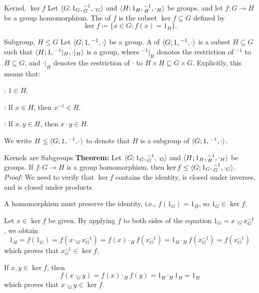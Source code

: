 \begin{dfnbox}{Kernel, $\ker f$}
	Let ${\langle {G; 1_G, {}^{-1}_G, \cdot_G} \rangle}$ and ${\langle {H; 1_H, {}^{-1}_H, \cdot_H} \rangle}$ be groups, and let $f: G \to H$ be a group homomorphism. The  of $f$ is the subset $\ker f \subseteq G$ defined by
	\[ \ker f \coloneq \{ x \in G : f(x) = 1_H \}. \]
\end{dfnbox}

\begin{dfnbox}{Subgroup, $H \le G$}
	Let ${\langle {G; 1, {}^{-1}, \cdot} \rangle}$ be a group. A  of ${\langle {G; 1, {}^{-1}, \cdot} \rangle}$ is a subset $H \subseteq G$ such that ${\langle {H; 1, {}^{-1}|_H, \cdot|_H} \rangle}$ is a group, where ${}^{-1}|_H$ denotes the restriction of ${}^{-1}$ to $H \subseteq G$, and $\cdot|_H$ denotes the restriction of $\cdot$ to $H \times H \subseteq G \times G$. Explicitly, this means that:
	\begin{dfnitems}
		\item {}: $1 \in H$.
		\item {}: If $x \in H$, then $x^{-1} \in H$.
		\item {}: If $x, y \in H$, then $x \cdot y \in H$.
	\end{dfnitems}
	We write $H \le {\langle {G; 1, {}^{-1}, \cdot} \rangle}$ to denote that $H$ is a subgroup of ${\langle {G; 1, {}^{-1}, \cdot} \rangle}$.
\end{dfnbox}

\begin{thmbox}{Kernels are Subgroups}
	\textbf{Theorem:} Let ${\langle {G; 1_G, {}^{-1}_G, \cdot_G} \rangle}$ and ${\langle {H; 1_H, {}^{-1}_H, \cdot_H} \rangle}$ be groups. If $f: G \to H$ is a group homomorphism, then $\ker f \le {\langle {G; 1_G, {}^{-1}_G, \cdot_G} \rangle}$.
	\tcblower
	\textit{Proof:} We need to verify that $\ker f$ contains the identity, is closed under inverses, and is closed under products.
	\begin{dfnitems}
		\item A homomorphism must preserve the identity, i.e., $f(1_G) = 1_H$, so $1_G \in \ker f$.
		\item Let $x \in \ker f$ be given. By applying $f$ to both sides of the equation $1_G = x \cdot_G x^{-1}_G$, we obtain
		\[ 1_H = f(1_G) = f(x \cdot_G x^{-1}_G) = f(x) \cdot_H f(x^{-1}_G) = 1_H \cdot_H f(x^{-1}_G) = f(x^{-1}_G) \]
		which proves that $x^{-1}_G \in \ker f$.
		\item If $x, y \in \ker f$, then
		\[ f(x \cdot_G y) = f(x) \cdot_H f(y) = 1_H \cdot_H 1_H = 1_H \]
		which proves that $x \cdot_G y \in \ker f$.
	\end{dfnitems}
\end{thmbox}


